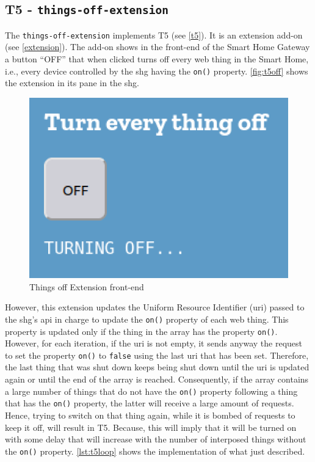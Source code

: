 \subsection{T5 - \texttt{things-off-extension}}
\label{t5poc}

The \texttt{things-off-extension} implements T5 (see \autoref{t5}). It is an extension add-on (see \autoref{extension}). The add-on shows in the front-end of the Smart Home Gateway a button ``OFF'' that when clicked turns off every \gls{web thing} in the Smart Home, i.e., every device controlled by the \gls{shg} having the \texttt{on()} property. \autoref{fig:t5off} shows the extension in its pane in the \gls{shg}.

\begin{figure}[H]
    \centering
    \includegraphics[scale=0.75]{images/addons/things-off.png}
    \caption{Things off Extension front-end}
    \label{fig:t5off}
\end{figure}

However, this extension updates the Uniform Resource Identifier (\gls{uri}) passed to the \gls{shg}'s \gls{api} in charge to update the \texttt{on()} property of each \gls{web thing}. This property is updated only if the thing in the array has the property \texttt{on()}. However, for each iteration, if the \gls{uri} is not empty, it sends anyway the request to set the property \texttt{on()} to \texttt{false} using the last \gls{uri} that has been set.
Therefore, the last thing that was shut down keeps being shut down until the \gls{uri} is updated again or until the end of the array is reached. Consequently, if the array contains a large number of things that do not have the \texttt{on()} property following a thing that has the \texttt{on()} property, the latter will receive a large amount of requests.
Hence, trying to switch on that thing again, while it is bombed of requests to keep it off, will result in T5. Because, this will imply that it will be turned on with some delay that will increase with the number of interposed things without the \texttt{on()} property. \autoref{lst:t5loop} shows the implementation of what just described.

